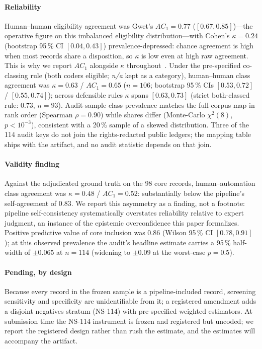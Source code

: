 \documentclass[conference]{IEEEtran}
\begin{document}
\paragraph*{Reliability}
Human--human eligibility agreement was Gwet's $AC_1 = 0.77$
($[0.67, 0.85]$)---the operative figure on this imbalanced
eligibility distribution---with Cohen's $\kappa = 0.24$ (bootstrap
95\,\% CI $[0.04, 0.43]$) prevalence-depressed: chance agreement is
high when most records share a disposition, so $\kappa$ is low even
at high raw agreement. This is why we report
$AC_1$ alongside $\kappa$ throughout~\cite{gwet,cohen}. Under the
pre-specified co-classing rule (both coders eligible; \emph{n/a}
kept as a category), human--human class agreement was
$\kappa = 0.63$ / $AC_1 = 0.65$ ($n = 106$; bootstrap 95\,\%
CIs $[0.53, 0.72]$ / $[0.55, 0.74]$); across defensible rules
$\kappa$ spans $[0.63, 0.73]$ (strict both-classed rule: $0.73$,
$n = 93$). Audit-sample class prevalence matches the full-corpus
map in rank order (Spearman $\rho = 0.90$) while shares differ
(Monte-Carlo $\chi^2(8)$, $p < 10^{-3}$), consistent with a
20\,\% sample of a skewed distribution. Three of the 114 audit
keys do not join the rights-redacted public ledgers; the mapping
table ships with the artifact, and no audit statistic depends on
that join.

\paragraph*{Validity finding}
Against the adjudicated ground truth on the 98 core records,
human--automation class agreement was $\kappa = 0.48$ /
$AC_1 = 0.52$: substantially below the pipeline's self-agreement
of 0.83. We report this asymmetry as a finding, not a footnote:
pipeline self-consistency systematically overstates reliability
relative to expert judgment, an instance of the epistemic
overconfidence this paper formalizes. Positive predictive value of
core inclusion was 0.86 (Wilson 95\,\% CI $[0.78, 0.91]$
\cite{wilson}); at this observed prevalence the audit's headline
estimate carries a 95\,\% half-width of $\pm 0.065$ at $n = 114$
(widening to $\pm 0.09$ at the worst-case $p = 0.5$).

\paragraph*{Pending, by design}
Because every record in the frozen sample is a pipeline-included
record, screening sensitivity and specificity are unidentifiable
from it; a registered amendment adds a disjoint negatives stratum
(NS-114) with pre-specified weighted estimators. At submission
time the NS-114 instrument is frozen and registered but uncoded;
we report the registered design rather than rush the estimate, and
the estimates will accompany the artifact.
\end{document}
